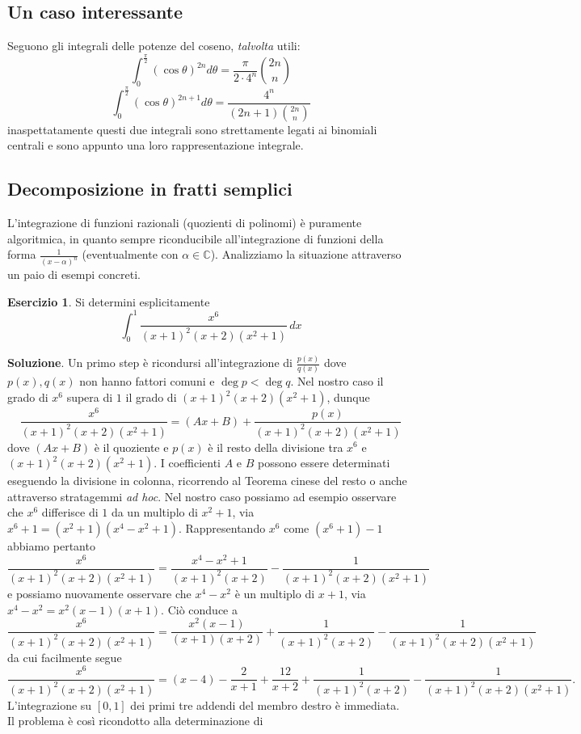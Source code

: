 \documentclass[a4paper,twoside]{article}
\newcommand{\C}{\mathbb{C}}
\theoremstyle{definition}
\newtheorem{ex}[theorem]{Esercizio}
\numberwithin{theorem}{section}
\begin{document}
\subsection{Un caso interessante}
Seguono gli integrali delle potenze del coseno, \emph{talvolta} utili:
$$\int_{0}^{\frac{\pi}{2}}(\cos \theta)^{2n}d\theta=\frac{\pi}{2\cdot4^n}\binom{2n}{n}$$
$$\int_{0}^{\frac{\pi}{2}}(\cos \theta)^{2n+1}d\theta= \frac{4^n}{(2n+1)\binom{2n}{n}}$$
inaspettatamente questi due integrali sono strettamente legati ai binomiali centrali e sono appunto una loro rappresentazione integrale.
\subsection{Decomposizione in fratti semplici}
L'integrazione di funzioni razionali (quozienti di polinomi) è puramente algoritmica, in quanto sempre riconducibile all'integrazione di funzioni della forma $\frac{1}{(x-\alpha)^n}$ (eventualmente con $\alpha\in\C$). Analizziamo la situazione attraverso un paio di esempi concreti.
\begin{ex} Si determini esplicitamente
$$ \int_{0}^{1}\frac{x^6}{(x+1)^2(x+2)(x^2+1)}\,dx $$ 
\end{ex}
\textbf{Soluzione}. Un primo step è ricondursi all'integrazione di $\frac{p(x)}{q(x)}$ dove $p(x),q(x)$ non hanno fattori comuni e $\deg p < \deg q$. Nel nostro caso il grado di $x^6$ supera di $1$ il grado di $(x+1)^2(x+2)(x^2+1)$, dunque 
$$ \frac{x^6}{(x+1)^2(x+2)(x^2+1)} = (Ax+B)+\frac{p(x)}{(x+1)^2(x+2)(x^2+1)}$$
dove $(Ax+B)$ è il quoziente e $p(x)$ è il resto della divisione tra $x^6$ e $(x+1)^2(x+2)(x^2+1)$. I coefficienti $A$ e $B$ possono essere determinati eseguendo la divisione in colonna, ricorrendo al Teorema cinese del resto o anche attraverso stratagemmi \emph{ad hoc}. Nel nostro caso possiamo ad esempio osservare che $x^6$ differisce di $1$ da un multiplo di $x^2+1$, via $x^6+1=(x^2+1)(x^4-x^2+1)$. Rappresentando $x^6$ come $(x^6+1)-1$ abbiamo pertanto 
$$ \frac{x^6}{(x+1)^2(x+2)(x^2+1)} = \frac{x^4-x^2+1}{(x+1)^2(x+2)}-\frac{1}{(x+1)^2(x+2)(x^2+1)}$$
e possiamo nuovamente osservare che $x^4-x^2$ è un multiplo di $x+1$, via $x^4-x^2=x^2(x-1)(x+1)$. Ciò conduce a 
$$ \frac{x^6}{(x+1)^2(x+2)(x^2+1)} = \frac{x^2(x-1)}{(x+1)(x+2)}+\frac{1}{(x+1)^2(x+2)}-\frac{1}{(x+1)^2(x+2)(x^2+1)}$$
da cui facilmente segue 
$$ \frac{x^6}{(x+1)^2(x+2)(x^2+1)} = (x-4)-\frac{2}{x+1}+\frac{12}{x+2}+\frac{1}{(x+1)^2(x+2)}-\frac{1}{(x+1)^2(x+2)(x^2+1)}.$$
L'integrazione su $[0,1]$ dei primi tre addendi del membro destro è immediata.\\ Il problema è così ricondotto alla determinazione di 
\end{document}
